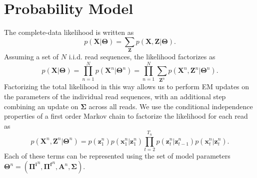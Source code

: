 \documentclass[reqno]{amsart}
\numberwithin{equation}{section}
\begin{document}
\section{Probability Model}
The complete-data likelihood is written as
\begin{equation}
p(\mathbf{X}|\mathbf{\Theta}) = \displaystyle\sum_{\mathbf{Z}}p(\mathbf{X},\mathbf{Z}|\mathbf{\Theta}).
\end{equation}
Assuming a set of $N$ i.i.d. read sequences, the likelihood factorizes as
\begin{equation}
p(\mathbf{X}|\mathbf{\Theta}) = \displaystyle\prod_{n=1}^{N}p(\mathbf{X}^n|\mathbf{\Theta}^n) = \displaystyle\prod_{n=1}^N\sum_{\mathbf{Z}^n}p(\mathbf{X}^n,\mathbf{Z}^n|\mathbf{\Theta}^n).
\end{equation}
Factorizing the total likelihood in this way allows us to perform EM updates on the parameters of the individual read sequences, with an additional step combining an update on $\mathbf{\Sigma}$ across all reads. We use the conditional independence properties of a first order Markov chain to factorize the likelihood for each read as
\begin{equation}
p(\mathbf{X}^n,\mathbf{Z}^n|\mathbf{\Theta}^n) = p(\mathbf{z}_1^n)p(\mathbf{x}_1^n|\mathbf{z}_1^n)\displaystyle\prod_{t=2}^{T_n}p(\mathbf{z}_{t}^n|\mathbf{z}_{t-1}^{n})p(\mathbf{x}_t^n|\mathbf{z}_t^n).
\end{equation}
Each of these terms can be represented using the set of model parameters $\mathbf{\Theta}^n=(\mathbf{\Pi^i}^n,\mathbf{\Pi^f}^n,\mathbf{A}^n,\mathbf{\Sigma})$.
\end{document}
